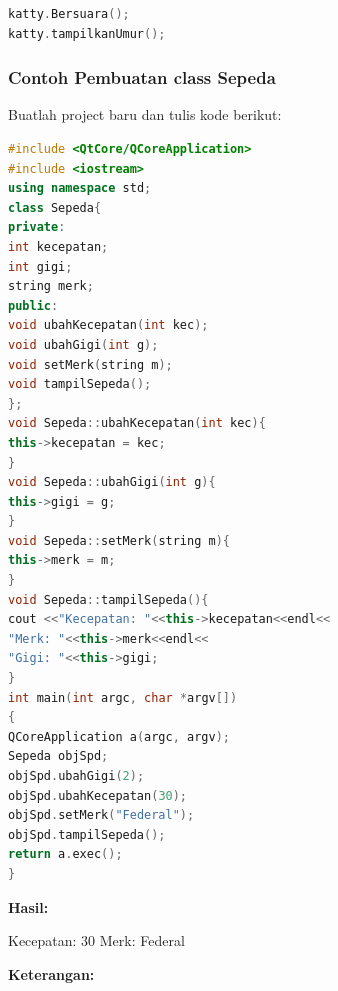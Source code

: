 \begin{lstlisting}[language=c++, numbers=none]
katty.Bersuara();
katty.tampilkanUmur();
\end{lstlisting}

\subsubsection*{Contoh  Pembuatan class Sepeda}

Buatlah project baru dan tulis kode berikut:

\begin{lstlisting}[language=c++, caption=Pembuatan class Sepeda, label=contoh6-1]
#include <QtCore/QCoreApplication>
#include <iostream>
using namespace std;
class Sepeda{
private:
int kecepatan;
int gigi;
string merk;
public:
void ubahKecepatan(int kec);
void ubahGigi(int g);
void setMerk(string m);
void tampilSepeda();
};
void Sepeda::ubahKecepatan(int kec){
this->kecepatan = kec;
}
void Sepeda::ubahGigi(int g){
this->gigi = g;
}
void Sepeda::setMerk(string m){
this->merk = m;
}
void Sepeda::tampilSepeda(){
cout <<"Kecepatan: "<<this->kecepatan<<endl<<
"Merk: "<<this->merk<<endl<<
"Gigi: "<<this->gigi;
}
int main(int argc, char *argv[])
{
QCoreApplication a(argc, argv);
Sepeda objSpd;
objSpd.ubahGigi(2);
objSpd.ubahKecepatan(30);
objSpd.setMerk("Federal");
objSpd.tampilSepeda();
return a.exec();
}
\end{lstlisting}

\textbf{Hasil:}

\begin{lcverbatim}
Kecepatan: 30 Merk: Federal
\end{lcverbatim}

\textbf{Keterangan:}

